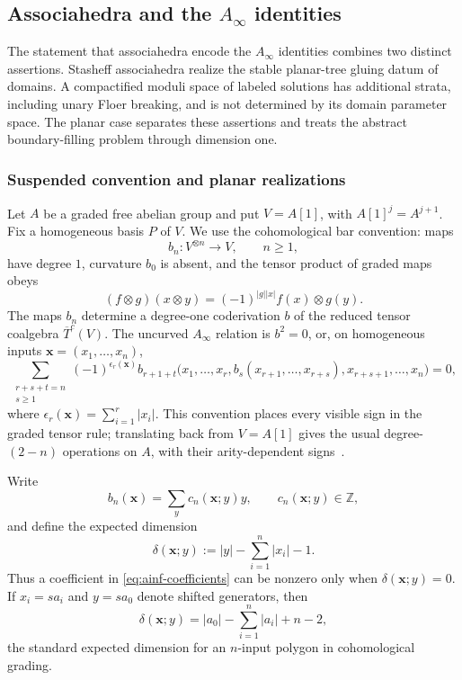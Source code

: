 \documentclass[11pt,letterpaper,twoside]{article}
\theoremstyle{plain}
\theoremstyle{definition}
\theoremstyle{remark}
\let\cite\citep
\newcommand{\Ainf}{A_\infty}
\begin{document}
\subsection{Associahedra and the \texorpdfstring{\(\Ainf\)}{A-infinity} identities}
\label{sec:planar-ainf}

The statement that associahedra encode the \(\Ainf\) identities combines two distinct assertions.  Stasheff associahedra realize the stable planar-tree gluing datum of domains.  A compactified moduli space of labeled solutions has additional strata, including unary Floer breaking, and is not determined by its domain parameter space.  The planar case separates these assertions and treats the abstract boundary-filling problem through dimension one.

\subsubsection{Suspended convention and planar realizations}

Let \(A\) be a graded free abelian group and put \(V=A[1]\), with \(A[1]^j=A^{j+1}\).  Fix a homogeneous basis \(P\) of \(V\).  We use the cohomological bar convention: maps
\[
 b_n:V^{\otimes n}\longrightarrow V,\qquad n\geq1,
\]
have degree \(1\), curvature \(b_0\) is absent, and the tensor product of graded maps obeys
\[
 (f\otimes g)(x\otimes y)=(-1)^{|g||x|}f(x)\otimes g(y).
\]
The maps \(b_n\) determine a degree-one coderivation \(b\) of the reduced tensor coalgebra \(\overline T^c(V)\).  The uncurved \(\Ainf\) relation is \(b^2=0\), or, on homogeneous inputs \(\mathbf x=(x_1,\ldots,x_n)\),
\begin{equation}\label{eq:ainf-suspended}
 \sum_{\substack{r+s+t=n\\s\geq1}}
 (-1)^{\epsilon_r(\mathbf x)}
 b_{r+1+t}\bigl(
 x_1,\ldots,x_r,
 b_s(x_{r+1},\ldots,x_{r+s}),
 x_{r+s+1},\ldots,x_n
 \bigr)=0,
\end{equation}
where \(\epsilon_r(\mathbf x)=\sum_{i=1}^r|x_i|\).  This convention places every visible sign in the graded tensor rule; translating back from \(V=A[1]\) gives the usual degree-\((2-n)\) operations on \(A\), with their arity-dependent signs~\cite{markl2002,seidel2008}.

Write
\begin{equation}\label{eq:ainf-coefficients}
 b_n(\mathbf x)=\sum_y c_n(\mathbf x;y)y,
 \qquad
 c_n(\mathbf x;y)\in\mathbb Z,
\end{equation}
and define the expected dimension
\begin{equation}\label{eq:planar-expected-dimension}
 \delta(\mathbf x;y)
 :=|y|-\sum_{i=1}^n|x_i|-1.
\end{equation}
Thus a coefficient in \eqref{eq:ainf-coefficients} can be nonzero only when \(\delta(\mathbf x;y)=0\).
If \(x_i=sa_i\) and \(y=sa_0\) denote shifted generators, then
\[
 \delta(\mathbf x;y)
 =|a_0|-\sum_{i=1}^n|a_i|+n-2,
\]
the standard expected dimension for an \(n\)-input polygon in cohomological grading.
\end{document}
